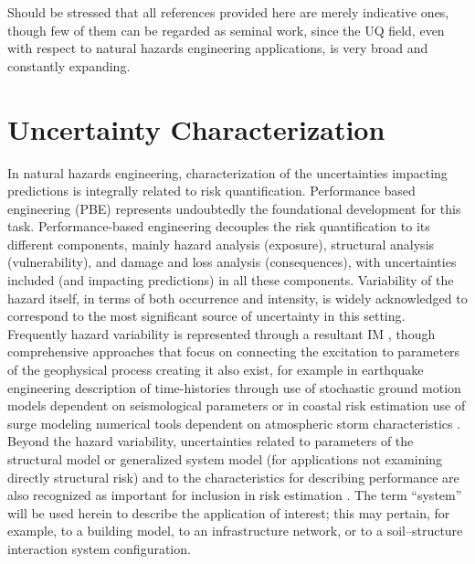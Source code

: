 Should be stressed that all references provided here are merely indicative ones, though few of them can be regarded as seminal work, since the UQ field, even with respect to natural hazards engineering applications, is very broad and constantly expanding.    

\section{Uncertainty Characterization}
\label{sec:uq_characterization}

In natural hazards engineering, characterization of the uncertainties impacting predictions is integrally related to risk quantification. Performance based engineering (PBE) \citep{whittaker2003performancebased, goulet2007evaluation, riggs2008experimental, ciampoli2011performancebased, barbato2013performancebased, fischer2019performancebased} represents undoubtedly the foundational development for this task. Performance-based engineering decouples the risk quantification to its different components, mainly hazard analysis (exposure), structural analysis (vulnerability), and damage and loss analysis (consequences), with uncertainties included (and impacting predictions) in all these components. Variability of the hazard itself, in terms of both occurrence and intensity, is widely acknowledged to correspond to the most significant source of uncertainty in this setting. Frequently hazard variability is represented through a resultant IM \citep{baker2005vectorvalued,kohrangi2016implications}, though comprehensive approaches that focus on connecting the excitation to parameters of the geophysical process creating it also exist, for example in earthquake engineering description of time-histories through use of stochastic ground motion models dependent on seismological parameters \citep{bijelic2018validation, vlachos2018predictive} or in coastal risk estimation use of surge modeling numerical tools dependent on atmospheric storm characteristics \citep{resio2007white}. Beyond the hazard variability, uncertainties related to parameters of the structural model or generalized system model (for applications not examining directly structural risk) and to the characteristics for describing performance are also recognized as important for inclusion in risk estimation \citep{porter2002sensitivity}. The term “system” will be used herein to describe the application of interest; this may pertain, for example, to a building model, to an infrastructure network, or to a soil–structure interaction system configuration. 

